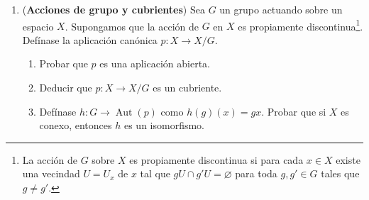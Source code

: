 \documentclass[11pt,a4paper]{article}
\theoremstyle{plain}
\theoremstyle{definition}
\theoremstyle{remark}
\DeclareMathOperator{\Aut}{Aut}
\begin{document}
\begin{enumerate}[label=\arabic*.,leftmargin=*]
\begin{enumerate}[label=\alph*)]
Entonces, $\{U_\alpha\times U'_\beta\}$ es una cubierta abierta de
$B\times B'$. Además,
\[
(p\times p')^{-1}(U_\alpha\times U'_\beta)=\bigsqcup_{i,j}(V_{i,\alpha}\times V'_{j,\beta}).
\]
Se tiene que la familia $V_{i,\alpha}\times V'_{j,\beta}$ es ajena, abierta
y, además, $p\times p'|_{V_{i,\alpha}\times V'_{j,\beta}}:V_{i,\alpha}\times V'_{j,\beta}\cong U_\alpha\times U'_\beta$.
\item Consideremos el siguiente diagrama conmutativo:
\[
\begin{tikzcd}
X\times_BX' \arrow[r,"\overline f"] \arrow[d,swap,"\overline p"] & X \arrow[d,"p"] \\
X' \arrow[r,swap,"f"] & B
\end{tikzcd}
\]
Sea $\{U_\alpha\}$ una cubierta abierta de $B$ tal que
$p^{-1}(U_\alpha)=\bigsqcup_iV_{i,\alpha}$, con $V_{i,\alpha}$ abiertos de
$X$ y $p:V_{i,\alpha}\cong U_\alpha$. Así, $f^{-1}(U_\alpha)$ forma una
cubierta abierta de $X'$ y además
\[
(\overline p)^{-1}(f^{-1}(U_\alpha))=(\overline f)^{-1}(p^{-1}(U_\alpha))=\bigsqcup_i(\overline f)^{-1}(V_{i,\alpha}).
\]
Ya que $\overline f$ es continua, se tiene que $(\overline f)^{-1}(V_{i,\alpha})$
son abiertos de $X\times_BX'$. Veamos que
$\overline p:(\overline f)^{-1}(V_{i,\alpha})\cong f^{-1}(U_\alpha)$. La
restricción $\overline p:(\overline f)^{-1}(V_{i,\alpha})\to f^{-1}(U_\alpha)$
es el pullback de $p:V_{i,\alpha}\to U_\alpha$ a lo largo de
$f:f^{-1}(U_\alpha)\to U_\alpha$. Por lo tanto $\overline p$ es
homeomorfismo.
\end{enumerate}

\item (\textbf{Acciones de grupo y cubrientes}) Sea $G$ un grupo actuando
sobre un espacio $X$. Supongamos que la acción de $G$ en $X$ es propiamente
discontinua\footnote{La acción de $G$ sobre $X$ es propiamente discontinua
si para cada $x\in X$ existe una vecindad $U=U_x$ de $x$ tal que
$gU\cap g'U=\varnothing$ para toda $g,g'\in G$ tales que $g\ne g'$.}.
Defínase la aplicación canónica $p:X\to X/G$.
\begin{enumerate}[label=\alph*)]
\item Probar que $p$ es una aplicación abierta.
\item Deducir que $p:X\to X/G$ es un cubriente.
\item Defínase $h:G\to\Aut(p)$ como $h(g)(x)=gx$. Probar que si $X$ es
conexo, entonces $h$ es un isomorfismo.
\end{enumerate}


\end{enumerate}
\end{document}
